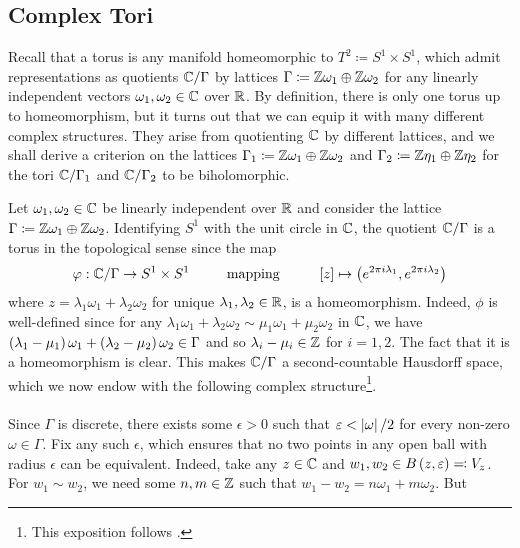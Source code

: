 \documentclass[../Moduli_Spaces_of_Riemann_Surfaces.tex]{subfiles}
\begin{document}
    \subsection{Complex Tori}
    Recall that a torus is any manifold homeomorphic to $T^2\coloneqq S^1\times S^1$, which admit representations as quotients $\mathbb{C}/\Gamma$ by lattices $\Gamma\coloneqq\mathbb{Z}\omega_1\oplus\mathbb{Z}\omega_2$ for any linearly independent vectors $\omega_1,\omega_2\in\mathbb{C}$ over $\mathbb{R}$. By definition, there is only one torus up to homeomorphism, but it turns out that we can equip it with many different complex structures. They arise from quotienting $\mathbb{C}$ by different lattices, and we shall derive a criterion on the lattices $\Gamma_1\coloneqq\mathbb{Z}\omega_1\oplus\mathbb{Z}\omega_2$ and $\Gamma_2\coloneqq\mathbb{Z}\eta_1\oplus\mathbb{Z}\eta_2$ for the tori $\mathbb{C}/\Gamma_1$ and $\mathbb{C}/\Gamma_2$ to be biholomorphic.
    \begin{example}\label{RS:exa:tori}
        Let $\omega_1,\omega_2\in\mathbb{C}$ be linearly independent over $\mathbb{R}$ and consider the lattice $\Gamma\coloneqq\mathbb{Z}\omega_1\oplus\mathbb{Z}\omega_2$. Identifying $S^1$ with the unit circle in $\mathbb{C}$, the quotient $\mathbb{C}/\Gamma$ is a torus in the topological sense since the map
        \begin{equation*}
            \phi:\C/\Gamma\to S^1\times S^1\ \ \ \ \ \ \ \ \textrm{mapping}\ \ \ \ \ \ \ \ \l[z\r]\mapsto\big(e^{2\pi i\lambda_1},e^{2\pi i\lambda_2}\big)
        \end{equation*}
        where $z=\lambda_1\omega_1+\lambda_2\omega_2$ for unique $\lambda_1,\lambda_2\in\mathbb{R}$, is a homeomorphism. Indeed, $\phi$ is well-defined since for any $\lambda_1\omega_1+\lambda_2\omega_2\sim\mu_1\omega_1+\mu_2\omega_2$ in $\mathbb{C}$, we have $\left(\lambda_1-\mu_1\right)\omega_1+\left(\lambda_2-\mu_2\right)\omega_2\in\Gamma$ and so $\lambda_i-\mu_i\in\mathbb{Z}$ for $i=1,2$. The fact that it is a homeomorphism is clear. This makes $\mathbb{C}/\Gamma$ a second-countable Hausdorff space, which we now endow with the following complex structure\footnote{This exposition follows \cite[][Section I.2]{miranda}.}.\\\ \\
        Since $\Gamma$ is discrete, there exists some $\epsilon>0$ such that $\varepsilon<\left|\omega\right|/2$ for every non-zero $\omega\in\Gamma$. Fix any such $\epsilon$, which ensures that no two points in any open ball with radius $\epsilon$ can be equivalent. Indeed, take any $z\in\mathbb{C}$ and $w_1,w_2\in B\left(z,\varepsilon\right)\eqqcolon V_z$. For $w_1\sim w_2$, we need some $n,m\in\mathbb{Z}$ such that $w_1-w_2=n\omega_1+m\omega_2$. But
        \begin{equation*}

\end{equation*}
\end{example}
\end{document}
